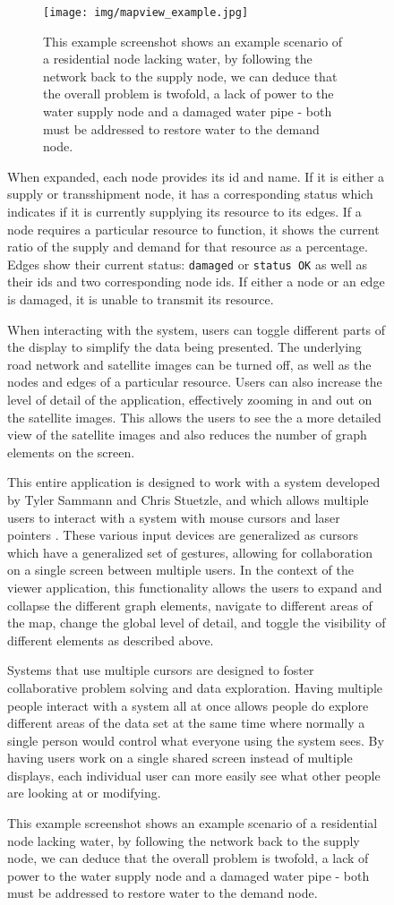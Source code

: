 \begin{figure}[htp]
{%

\begin{figure}[htp] \centering
    \texttt{[image: img/mapview\_example.jpg]}
    \caption[Example Infrastructure Visualization]{This example screenshot shows an example scenario of a residential node lacking water,
    by following the network back to the supply node, we can deduce that the overall problem is twofold, a lack of power
    to the water supply node and a damaged water pipe - both must be addressed to restore water to the demand node.}
    \label{fig:mapview_example}
\end{figure}

When expanded, each node provides its id and name. If it is either a supply or transshipment node, it has a
corresponding status which indicates if it is currently supplying its resource to its edges. If a node requires a particular resource to function, it shows the current ratio of the supply and demand for that resource as a percentage. Edges show their current status: {\tt damaged} or {\tt status OK} as well as their ids and two corresponding node ids. If either a node or an edge is damaged, it is unable to transmit its resource.

When interacting with the system, users can toggle different parts of the display to simplify the data being presented. The underlying road network and satellite images can be turned off, as well as the nodes and edges of a particular resource. Users can also increase the level of detail of the application, effectively zooming in and out on the satellite images. This allows the users to see the a more detailed view of the satellite images and also reduces the number of graph elements on the screen. 

This entire application is designed to work with a system developed by Tyler Sammann and Chris Stuetzle, and which allows multiple users to interact with a system with mouse cursors and laser pointers \cite{Sammann2013}. These various input devices are generalized as cursors which have a generalized set of gestures, allowing for collaboration on a single screen between multiple users. In the context of the viewer application, this functionality allows the users to expand and
collapse the different graph elements, navigate to different areas of the map, change the global level of detail, and toggle the visibility of different elements as described above.

Systems that use multiple cursors are designed to foster collaborative problem solving and data exploration. Having multiple people interact with a system all at once allows people do explore different areas of the data set at the same time where normally a single person would control what everyone using the system sees. By having users work on a single shared screen instead of multiple displays, each individual user can more easily see what other people are looking at or
modifying.

}
\end{figure}
